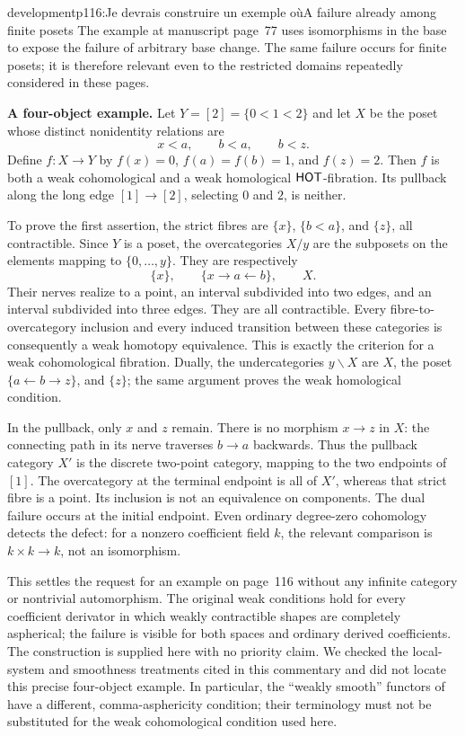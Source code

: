 \begin{dcomment}{development}{p116:Je devrais construire un exemple où}{A failure already among finite posets}
The example at manuscript page~77 uses isomorphisms in the base to expose the failure of arbitrary base change. The same failure occurs for finite posets; it is therefore relevant even to the restricted domains repeatedly considered in these pages.

\textbf{A four-object example.}\ours\quad
Let $Y=[2]=\{0<1<2\}$ and let $X$ be the poset whose distinct nonidentity relations are
\[
 x<a,\qquad b<a,\qquad b<z.
\]
Define $f:X\to Y$ by $f(x)=0$, $f(a)=f(b)=1$, and $f(z)=2$. Then $f$ is both a weak cohomological and a weak homological $\mathsf{HOT}$-fibration. Its pullback along the long edge $[1]\to[2]$, selecting $0$ and $2$, is neither.

To prove the first assertion, the strict fibres are $\{x\}$, $\{b<a\}$, and $\{z\}$, all contractible. Since $Y$ is a poset, the overcategories $X/y$ are the subposets on the elements mapping to $\{0,\ldots,y\}$. They are respectively
\[
 \{x\},\qquad \{x\to a\leftarrow b\},\qquad X.
\]
Their nerves realize to a point, an interval subdivided into two edges, and an interval subdivided into three edges. They are all contractible. Every fibre-to-overcategory inclusion and every induced transition between these categories is consequently a weak homotopy equivalence. This is exactly the criterion for a weak cohomological fibration. Dually, the undercategories $y\backslash X$ are $X$, the poset $\{a\leftarrow b\to z\}$, and $\{z\}$; the same argument proves the weak homological condition.

In the pullback, only $x$ and $z$ remain. There is no morphism $x\to z$ in $X$: the connecting path in its nerve traverses $b\to a$ backwards. Thus the pullback category $X'$ is the discrete two-point category, mapping to the two endpoints of $[1]$. The overcategory at the terminal endpoint is all of $X'$, whereas that strict fibre is a point. Its inclusion is not an equivalence on components. The dual failure occurs at the initial endpoint. Even ordinary degree-zero cohomology detects the defect: for a nonzero coefficient field $k$, the relevant comparison is $k\times k\to k$, not an isomorphism.

This settles the request for an example on page~116 without any infinite category or nontrivial automorphism. The original weak conditions hold for every coefficient derivator in which weakly contractible shapes are completely aspherical; the failure is visible for both spaces and ordinary derived coefficients. The construction is supplied here with no priority claim. We checked the local-system and smoothness treatments cited in this commentary and did not locate this precise four-object example. In particular, the ``weakly smooth'' functors of \citet[Definition~4.1 and Proposition~4.3]{Maltsiniotis2005Asphericite} have a different, comma-asphericity condition; their terminology must not be substituted for the weak cohomological condition used here.
\end{dcomment}


